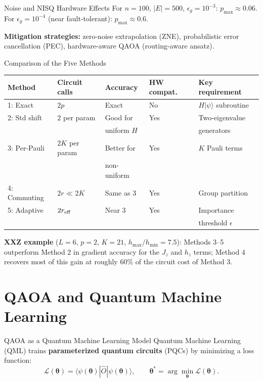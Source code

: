 \documentclass{beamer}
\begin{document}
\begin{frame}
\begin{frame}{Noise and NISQ Hardware Effects}
For $n=100$, $|E|=500$, $\epsilon_g=10^{-3}$: $p_{\max}\approx 0.06$.
For $\epsilon_g=10^{-4}$ (near fault-tolerant): $p_{\max}\approx 0.6$.

\medskip

\textbf{Mitigation strategies:}
zero-noise extrapolation (ZNE), probabilistic error cancellation (PEC),
hardware-aware QAOA (routing-aware ansatz).
\end{frame}


\begin{frame}{Comparison of the Five Methods}
\begin{center}
\small
\begin{tabular}{lllll}
\hline
\textbf{Method} & \textbf{Circuit calls} & \textbf{Accuracy} &
  \textbf{HW compat.} & \textbf{Key requirement} \\
\hline
1: Exact & $2p$ & Exact & No & $H|\psi\rangle$ subroutine \\
2: Std shift & $2$ per param & Good for & Yes & Two-eigenvalue \\
             & & uniform $H$ & & generators \\
3: Per-Pauli & $2K$ per param & Better for & Yes & $K$ Pauli terms \\
             & & non-uniform & & \\
4: Commuting & $2r\ll 2K$ & Same as 3 & Yes & Group partition \\
5: Adaptive & $2r_{\rm eff}$ & Near 3 & Yes & Importance \\
            & & & & threshold $\epsilon$ \\
\hline
\end{tabular}
\end{center}

\medskip

\textbf{XXZ example} ($L=6$, $p=2$, $K=21$,
$h_{\max}/h_{\min}=7.5$):
Methods 3--5 outperform Method 2 in gradient accuracy for the
$J_z$ and $h_z$ terms; Method 4 recovers most of this gain
at roughly $60\%$ of the circuit cost of Method 3.
\end{frame}


\section{QAOA and Quantum Machine Learning}

\begin{frame}{QAOA as a Quantum Machine Learning Model}
Quantum Machine Learning (QML) trains \textbf{parameterized quantum
circuits} (PQCs) by minimizing a loss function:
\[
\mathcal{L}(\boldsymbol{\theta})
= \langle\psi(\boldsymbol{\theta})|\hat{O}|\psi(\boldsymbol{\theta})\rangle,
\qquad
\boldsymbol{\theta}^* = \arg\min_{\boldsymbol{\theta}}\mathcal{L}(\boldsymbol{\theta}).
\]


\end{frame}
\end{frame}
\end{document}
